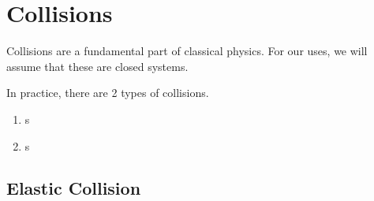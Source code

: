 \section{Collisions}\label{sec:Collisions}
Collisions are a fundamental part of classical physics.
For our uses, we will assume that these are closed systems.

In practice, there are 2 types of collisions.

\begin{enumerate}
  \item {}s
  \item {}s
\end{enumerate}

\subsection{Elastic Collision}\label{subsec:Elastic Collision}
